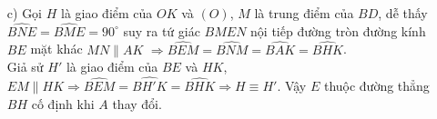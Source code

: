 \begin{ex}
{\begin{enumerate}
 Chứng minh tương tự hai tam giác  $AFO$ và $ADB$ đồng dạng suy ra $OF= \dfrac{AO.BD}{AB}~(4)$. \\
 Vì $AD$ là phân giác suy ra $\dfrac{AB}{AC} = \dfrac{DB}{DC}~(5)$. \\
 $4S_{AEOF} = OE.AB+OF.AC ~(6)$ \\
 Từ $(3),(4),(5),(6)$  ta có $4S_{AEOF} = AO(BD+CD) = R.a \Rightarrow S_{AEOF} = \dfrac{R.a}{4}$. 
 \item[c)] Gọi $H$ là giao điểm của $OK$ và $(O)$, $M$  là trung điểm của $BD$, dễ thấy $\widehat{BNE} = \widehat{BME} = 90^\circ$ suy ra tứ giác $BMEN$ nội tiếp đường tròn đường kính $BE$
mặt khác $MN \parallel AK$ $\Rightarrow \widehat{BEM} =\widehat{BNM} =\widehat{BAK} =\widehat{BHK}$. \\
Giả sử $H'$ là giao điểm của $BE$ và $HK$, $EM \parallel HK \Rightarrow \widehat{BEM} = \widehat{BH'K}=\widehat{BHK} \Rightarrow H \equiv H'$. Vậy $E$ thuộc đường thẳng $BH$ cố định khi $A$ thay đổi. 
\end{enumerate}
}
\end{ex}

